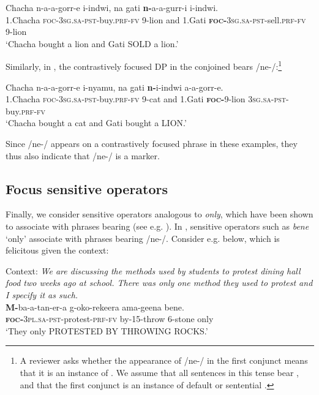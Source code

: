 \documentclass[output=paper,modfonts]{langscibook}
\begin{document}
\ea\label{ex:landmann:22}
\gll Chacha n-a-a-gorr-e i-indwi, na gati \textbf{n-}a-a-gurr-i i-indwi.\\
     1.Chacha \textsc{foc}-\textsc{3sg}.\textsc{sa}-\textsc{pst}-buy.\textsc{prf}-\textsc{fv} 9-lion and 1.Gati \textsc{\textbf{foc-}}\textsc{3sg}.\textsc{sa}-\textsc{pst}-sell.\textsc{prf}-\textsc{fv} 9-lion\\
\glt ‘Chacha bought a lion and Gati SOLD a lion.’
\z

Similarly, in , the contrastively focused DP in the conjoined  bears /ne-/:\footnote{A reviewer asks whether the appearance of /ne-/ in the first conjunct means that it is an instance of . We assume that all sentences in this tense bear , and that the first conjunct is an instance of default or sentential .}

\ea\label{ex:landmann:23}
  \gll Chacha n-a-a-gorr-e i-nyamu, na gati \textbf{n-}i-indwi\textbf{} a-a-gorr-e.\\
     1.Chacha \textsc{foc}-\textsc{3sg}.\textsc{sa}-\textsc{pst}-buy.\textsc{prf}-\textsc{fv} 9-cat and 1.Gati \textsc{\textbf{foc-}}9-lion \textsc{3sg}.\textsc{sa}-\textsc{pst}-buy.\textsc{prf}-\textsc{fv}\\
\glt ‘Chacha bought a cat and Gati bought a LION.’
\z

Since /ne-/ appears on a contrastively focused phrase in these examples, they thus also indicate that /ne-/ is a  marker.


\subsection{Focus sensitive operators}



Finally, we consider  sensitive operators analogous to  \textit{only}, which have been shown to associate with phrases bearing  (see e.g. \citealt{Rooth1992,Rooth1996}). In ,  sensitive operators such as \textit{bene} `only' associate with phrases bearing /ne-/. Consider e.g.  below, which is felicitous given the context:



\ea\label{ex:landmann:24} 
{Context: \textit{We are discussing the methods used by students to protest dining hall food two weeks ago at school. There was only one method they used to protest and I specify it as such.}}\\
\gll \textbf{M-}ba-a-tan-er-a g-oko-rekeera ama-geena bene.\\
     \textsc{\textbf{foc}}\textbf{-}\textsc{3pl}.\textsc{sa}-\textsc{pst}-protest-\textsc{prf}-\textsc{fv} by-15-throw 6-stone only\\
\glt ‘They only PROTESTED BY THROWING ROCKS.’
\z
\end{document}
